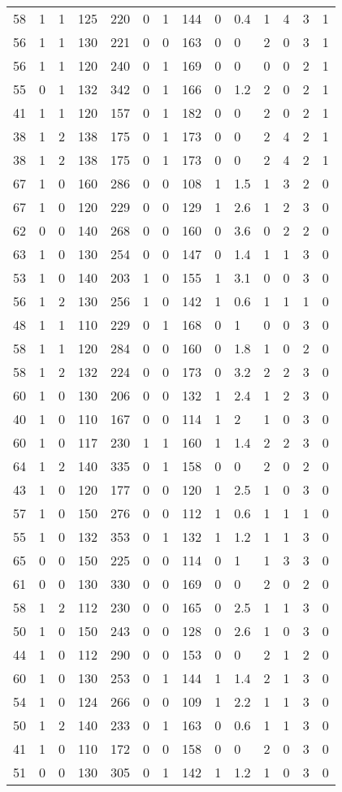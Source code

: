 \documentclass{article}
\begin{document}
\begin{longtable}{|l|l|l|l|l|l|l|l|l|l|l|l|l|l|}
58&1&1&125&220&0&1&144&0&0.4&1&4&3&1 \\ 
56&1&1&130&221&0&0&163&0&0&2&0&3&1 \\ 
56&1&1&120&240&0&1&169&0&0&0&0&2&1 \\ 
55&0&1&132&342&0&1&166&0&1.2&2&0&2&1 \\ 
41&1&1&120&157&0&1&182&0&0&2&0&2&1 \\ 
38&1&2&138&175&0&1&173&0&0&2&4&2&1 \\ 
38&1&2&138&175&0&1&173&0&0&2&4&2&1 \\ 
67&1&0&160&286&0&0&108&1&1.5&1&3&2&0 \\ 
67&1&0&120&229&0&0&129&1&2.6&1&2&3&0 \\ 
62&0&0&140&268&0&0&160&0&3.6&0&2&2&0 \\ 
63&1&0&130&254&0&0&147&0&1.4&1&1&3&0 \\ 
53&1&0&140&203&1&0&155&1&3.1&0&0&3&0 \\ 
56&1&2&130&256&1&0&142&1&0.6&1&1&1&0 \\ 
48&1&1&110&229&0&1&168&0&1&0&0&3&0 \\ 
58&1&1&120&284&0&0&160&0&1.8&1&0&2&0 \\ 
58&1&2&132&224&0&0&173&0&3.2&2&2&3&0 \\ 
60&1&0&130&206&0&0&132&1&2.4&1&2&3&0 \\ 
40&1&0&110&167&0&0&114&1&2&1&0&3&0 \\ 
60&1&0&117&230&1&1&160&1&1.4&2&2&3&0 \\ 
64&1&2&140&335&0&1&158&0&0&2&0&2&0 \\ 
43&1&0&120&177&0&0&120&1&2.5&1&0&3&0 \\ 
57&1&0&150&276&0&0&112&1&0.6&1&1&1&0 \\ 
55&1&0&132&353&0&1&132&1&1.2&1&1&3&0 \\ 
65&0&0&150&225&0&0&114&0&1&1&3&3&0 \\ 
61&0&0&130&330&0&0&169&0&0&2&0&2&0 \\ 
58&1&2&112&230&0&0&165&0&2.5&1&1&3&0 \\ 
50&1&0&150&243&0&0&128&0&2.6&1&0&3&0 \\ 
44&1&0&112&290&0&0&153&0&0&2&1&2&0 \\ 
60&1&0&130&253&0&1&144&1&1.4&2&1&3&0 \\ 
54&1&0&124&266&0&0&109&1&2.2&1&1&3&0 \\ 
50&1&2&140&233&0&1&163&0&0.6&1&1&3&0 \\ 
41&1&0&110&172&0&0&158&0&0&2&0&3&0 \\ 
51&0&0&130&305&0&1&142&1&1.2&1&0&3&0 \\ 

\end{longtable}
\end{document}
